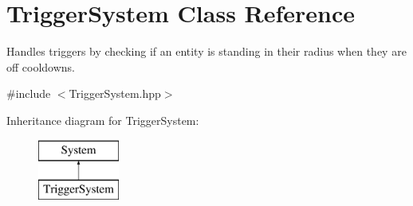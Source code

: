 \hypertarget{class_trigger_system}{}\section{Trigger\+System Class Reference}
\label{class_trigger_system}


Handles triggers by checking if an entity is standing in their radius when they are off cooldowns.  




{\ttfamily \#include $<$Trigger\+System.\+hpp$>$}

Inheritance diagram for Trigger\+System\+:\begin{figure}[H]
\begin{center}
\leavevmode
\includegraphics[height=2.000000cm]{class_trigger_system}
\end{center}
\end{figure}
